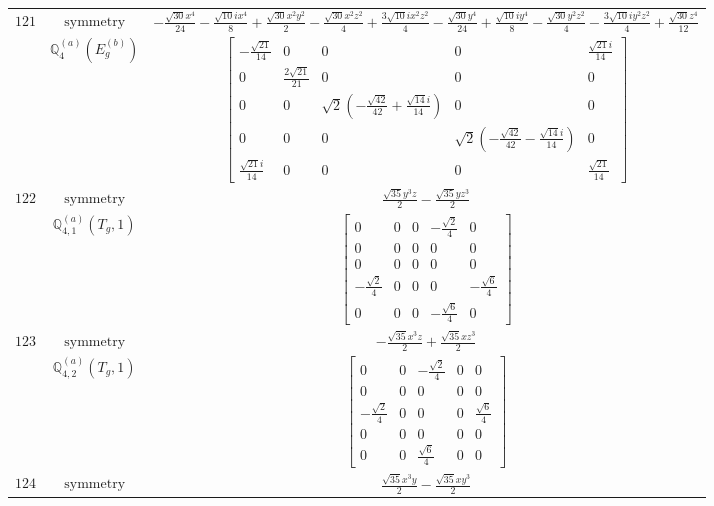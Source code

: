 \documentclass[fleqn,8pt,landscape]{jsarticle}
\begin{document}
\begin{longtable}{ccc}
$ 121 $ & $ \text{symmetry} $ & $ - \frac{\sqrt{30} x^{4}}{24} - \frac{\sqrt{10} i x^{4}}{8} + \frac{\sqrt{30} x^{2} y^{2}}{2} - \frac{\sqrt{30} x^{2} z^{2}}{4} + \frac{3 \sqrt{10} i x^{2} z^{2}}{4} - \frac{\sqrt{30} y^{4}}{24} + \frac{\sqrt{10} i y^{4}}{8} - \frac{\sqrt{30} y^{2} z^{2}}{4} - \frac{3 \sqrt{10} i y^{2} z^{2}}{4} + \frac{\sqrt{30} z^{4}}{12} $ \\
$  $ & $ \mathbb{Q}_{4}^{(a)}(E_{g}^{(b)}) $ & $ \begin{bmatrix} - \frac{\sqrt{21}}{14} & 0 & 0 & 0 & \frac{\sqrt{21} i}{14} \\ 0 & \frac{2 \sqrt{21}}{21} & 0 & 0 & 0 \\ 0 & 0 & \sqrt{2} \left(- \frac{\sqrt{42}}{42} + \frac{\sqrt{14} i}{14}\right) & 0 & 0 \\ 0 & 0 & 0 & \sqrt{2} \left(- \frac{\sqrt{42}}{42} - \frac{\sqrt{14} i}{14}\right) & 0 \\ \frac{\sqrt{21} i}{14} & 0 & 0 & 0 & \frac{\sqrt{21}}{14} \end{bmatrix} $ \\ \hline
$ 122 $ & $ \text{symmetry} $ & $ \frac{\sqrt{35} y^{3} z}{2} - \frac{\sqrt{35} y z^{3}}{2} $ \\
$  $ & $ \mathbb{Q}_{4,1}^{(a)}(T_{g},1) $ & $ \begin{bmatrix} 0 & 0 & 0 & - \frac{\sqrt{2}}{4} & 0 \\ 0 & 0 & 0 & 0 & 0 \\ 0 & 0 & 0 & 0 & 0 \\ - \frac{\sqrt{2}}{4} & 0 & 0 & 0 & - \frac{\sqrt{6}}{4} \\ 0 & 0 & 0 & - \frac{\sqrt{6}}{4} & 0 \end{bmatrix} $ \\ \hline
$ 123 $ & $ \text{symmetry} $ & $ - \frac{\sqrt{35} x^{3} z}{2} + \frac{\sqrt{35} x z^{3}}{2} $ \\
$  $ & $ \mathbb{Q}_{4,2}^{(a)}(T_{g},1) $ & $ \begin{bmatrix} 0 & 0 & - \frac{\sqrt{2}}{4} & 0 & 0 \\ 0 & 0 & 0 & 0 & 0 \\ - \frac{\sqrt{2}}{4} & 0 & 0 & 0 & \frac{\sqrt{6}}{4} \\ 0 & 0 & 0 & 0 & 0 \\ 0 & 0 & \frac{\sqrt{6}}{4} & 0 & 0 \end{bmatrix} $ \\ \hline
$ 124 $ & $ \text{symmetry} $ & $ \frac{\sqrt{35} x^{3} y}{2} - \frac{\sqrt{35} x y^{3}}{2} $ \\

\end{longtable}
\end{document}
